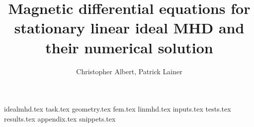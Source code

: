 \documentclass[a4paper, twoside, 10pt, english]{article}
\title{Magnetic differential equations for stationary linear ideal MHD and their numerical solution}
\author{Christopher Albert, Patrick Lainer}
\numberwithin{equation}{section}
\begin{document}
\maketitle
{}
\tableofcontents
\clearpage
{idealmhd.tex}
{task.tex}
{geometry.tex}
{fem.tex}
{linmhd.tex}
{inputs.tex}
{tests.tex}
{results.tex}
\appendix
{appendix.tex}
{snippets.tex}
\printbibliography[heading=bibintoc]
\end{document}
